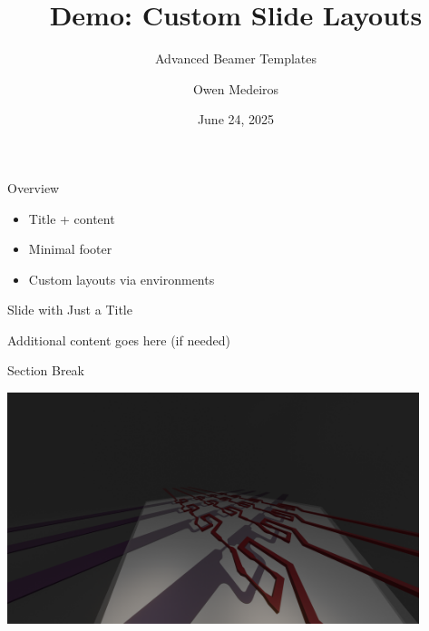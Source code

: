 \documentclass[aspectratio=169]{beamer}
\title{Demo: Custom Slide Layouts}
\subtitle{Advanced Beamer Templates}
\author{Owen Medeiros}
\affil{Quantum Nanostructures and Nanofabrication Group, MIT}
\date{June 24, 2025}
\begin{document}
\begin{SlideTitleSlide}
\end{SlideTitleSlide}


\begin{SlideTitleContent}{Overview}
    \begin{itemize}
        \item Title + content
        \item Minimal footer
        \item Custom layouts via environments
    \end{itemize}
\end{SlideTitleContent}

\begin{SlideTitleOnly}{Slide with Just a Title}
    \begin{center}
        \Large Additional content goes here (if needed)
    \end{center}
\end{SlideTitleOnly}

\begin{SlideTitleCentered}{Section Break}
\end{SlideTitleCentered}

\begin{SlideImageOnly}
    \includegraphics[width=0.9\textwidth]{example_image.png}  %
\end{SlideImageOnly}
\end{document}

